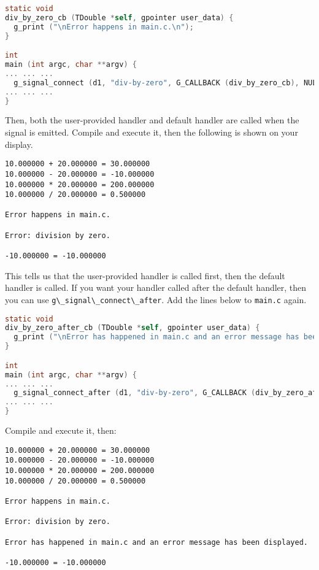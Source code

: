 \begin{lstlisting}[language=C]
static void
div_by_zero_cb (TDouble *self, gpointer user_data) {
  g_print ("\nError happens in main.c.\n");
}

int
main (int argc, char **argv) {
... ... ...
  g_signal_connect (d1, "div-by-zero", G_CALLBACK (div_by_zero_cb), NULL);
... ... ...
}
\end{lstlisting}

Then, both the user-provided handler and default handler are called when
the signal is emitted. Compile and execute it, then the following is
shown on your display.

\begin{lstlisting}
10.000000 + 20.000000 = 30.000000
10.000000 - 20.000000 = -10.000000
10.000000 * 20.000000 = 200.000000
10.000000 / 20.000000 = 0.500000

Error happens in main.c.

Error: division by zero.

-10.000000 = -10.000000
\end{lstlisting}

This tells us that the user-provided handler is called first, then the
default handler is called. If you want your handler called after the
default handler, then you can use
\passthrough{\lstinline!g\_signal\_connect\_after!}. Add the lines below
to \passthrough{\lstinline!main.c!} again.

\begin{lstlisting}[language=C]
static void
div_by_zero_after_cb (TDouble *self, gpointer user_data) {
  g_print ("\nError has happened in main.c and an error message has been displayed.\n");
}

int
main (int argc, char **argv) {
... ... ...
  g_signal_connect_after (d1, "div-by-zero", G_CALLBACK (div_by_zero_after_cb), NULL);
... ... ...
}
\end{lstlisting}

Compile and execute it, then:

\begin{lstlisting}
10.000000 + 20.000000 = 30.000000
10.000000 - 20.000000 = -10.000000
10.000000 * 20.000000 = 200.000000
10.000000 / 20.000000 = 0.500000

Error happens in main.c.

Error: division by zero.

Error has happened in main.c and an error message has been displayed.

-10.000000 = -10.000000
\end{lstlisting}

